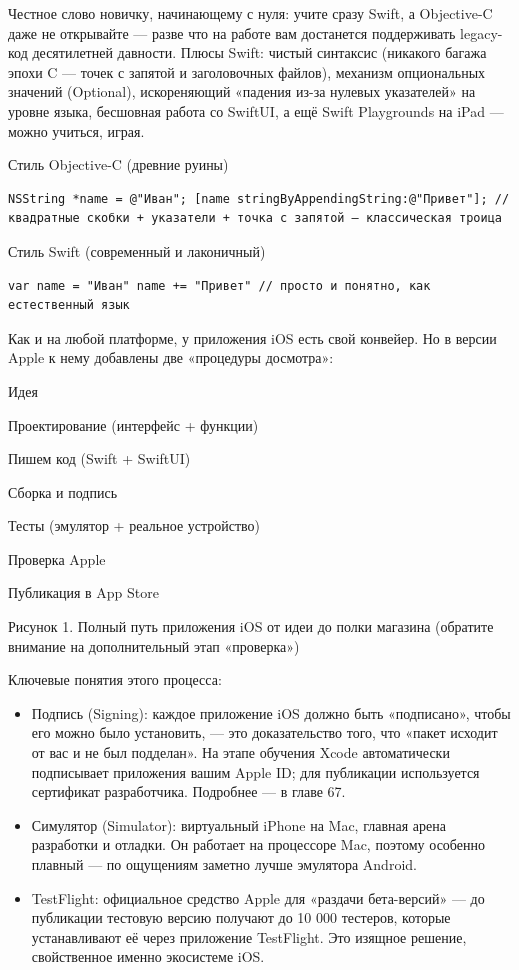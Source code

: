 Честное слово новичку, начинающему с нуля: учите сразу Swift, а Objective-C даже не открывайте — разве что на работе вам достанется поддерживать legacy-код десятилетней давности. Плюсы Swift: чистый синтаксис (никакого багажа эпохи C — точек с запятой и заголовочных файлов), механизм опциональных значений (Optional), искореняющий «падения из-за нулевых указателей» на уровне языка, бесшовная работа со SwiftUI, а ещё Swift Playgrounds на iPad — можно учиться, играя.

Стиль Objective-C (древние руины)

\begin{lstlisting}
NSString *name = @"Иван"; [name stringByAppendingString:@"Привет"]; // квадратные скобки + указатели + точка с запятой — классическая троица
\end{lstlisting}

Стиль Swift (современный и лаконичный)

\begin{lstlisting}
var name = "Иван" name += "Привет" // просто и понятно, как естественный язык
\end{lstlisting}


Как и на любой платформе, у приложения iOS есть свой конвейер. Но в версии Apple к нему добавлены две «процедуры досмотра»:

Идея

Проектирование (интерфейс + функции)

Пишем код (Swift + SwiftUI)

Сборка и подпись

Тесты (эмулятор + реальное устройство)

Проверка Apple

Публикация в App Store

\begin{center}\small\color{gray}Рисунок 1. Полный путь приложения iOS от идеи до полки магазина (обратите внимание на дополнительный этап «проверка»)\end{center}

Ключевые понятия этого процесса:

\begin{itemize}
  \item Подпись (Signing): каждое приложение iOS должно быть «подписано», чтобы его можно было установить, — это доказательство того, что «пакет исходит от вас и не был подделан». На этапе обучения Xcode автоматически подписывает приложения вашим Apple ID; для публикации используется сертификат разработчика. Подробнее — в главе 67.
  \item Симулятор (Simulator): виртуальный iPhone на Mac, главная арена разработки и отладки. Он работает на процессоре Mac, поэтому особенно плавный — по ощущениям заметно лучше эмулятора Android.
  \item TestFlight: официальное средство Apple для «раздачи бета-версий» — до публикации тестовую версию получают до 10 000 тестеров, которые устанавливают её через приложение TestFlight. Это изящное решение, свойственное именно экосистеме iOS.
\end{itemize}

